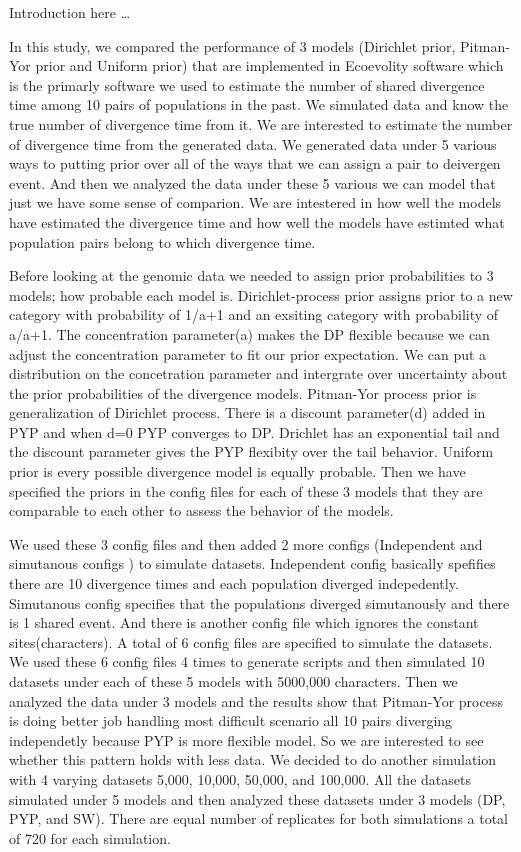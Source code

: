 Introduction here \ldots

In this study, we compared the performance of 3 models (Dirichlet prior, Pitman-Yor prior and Uniform prior) 
that are implemented in Ecoevolity software which is the primarly software we used to estimate the number of shared divergence time 
among 10 pairs of populations in the past. We simulated data and know the true number of divergence time from it. We are interested 
to estimate the number of divergence time from the generated data. We generated data under 5 various ways to putting prior over all
 of the ways that we can assign a pair to deivergen event. And then we analyzed the data under these 5 various we can model that 
just we have some sense of comparion. We are intestered in how well the models have estimated the divergence time and how well 
the models have estimted what population pairs belong to which divergence time. 

Before looking at the genomic data we needed to assign prior probabilities to 3 models; how probable each model is. Dirichlet-process prior 
assigns prior to a new category with probability of 1/a+1 and an exsiting category with probability of a/a+1. The concentration parameter(a) 
makes the DP flexible because we can adjust the concentration parameter to fit our prior expectation. We can put a distribution on the 
concetration parameter and intergrate over uncertainty about the prior probabilities of the divergence models. Pitman-Yor process prior is 
generalization of Dirichlet process. There is a discount parameter(d) added in PYP and when d=0 PYP converges to DP. Drichlet has an exponential tail 
and the discount parameter gives the PYP flexibity over the tail behavior. Uniform prior is every possible divergence model is equally probable. 
Then we have specified the priors in the config files for each of these 3 models that they are comparable to each other to assess the behavior of the models. 

We used these 3 config files and then added 2 more configs (Independent and simutanous configs ) to simulate datasets. Independent config 
basically spefifies there are 10 divergence times and each population diverged indepedently. Simutanous config specifies that the populations 
diverged simutanously and there is 1 shared event. And there is another config file which ignores the constant sites(characters). A total of 6 config 
files are specified to simulate the datasets. We used these 6 config files 4 times to generate scripts and then simulated 10 datasets under each of 
these 5 models with 5000,000 characters. Then we analyzed the data under 3 models and the results show that Pitman-Yor process is doing better job handling 
most difficult scenario all 10 pairs diverging independetly because PYP is more flexible model. So we are interested to see whether this pattern holds with 
less data. We decided to do another simulation with 4 varying datasets 5,000, 10,000, 50,000, and 100,000. All the datasets simulated under 5 models and 
then analyzed these datasets under 3 models (DP, PYP, and SW). There are equal number of replicates for both simulations a total of 720 for each simulation.
 



 
 
      


